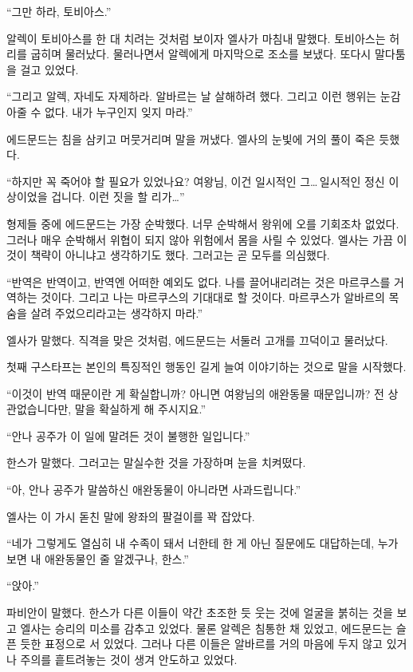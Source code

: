 ``그만 하라, 토비아스.''

알렉이 토비아스를 한 대 치려는 것처럼 보이자 엘사가 마침내 말했다. 토비아스는 허리를 굽히며 물러났다. 물러나면서 알렉에게 마지막으로 조소를 보냈다. 또다시 말다툼을 걸고 있었다.

``그리고 알렉, 자네도 자제하라. 알바르는 날 살해하려 했다. 그리고 이런 행위는 눈감아줄 수 없다. 내가 누구인지 잊지 마라.''

에드문드는 침을 삼키고 머뭇거리며 말을 꺼냈다. 엘사의 눈빛에 거의 풀이 죽은 듯했다.

``하지만 꼭 죽어야 할 필요가 있었나요? 여왕님, 이건 일시적인 그\ldots\,일시적인 정신 이상이었을 겁니다. 이런 짓을 할 리가\ldots''

형제들 중에 에드문드는 가장 순박했다. 너무 순박해서 왕위에 오를 기회조차 없었다. 그러나 매우 순박해서 위협이 되지 않아 위험에서 몸을 사릴 수 있었다. 엘사는 가끔 이것이 책략이 아니냐고 생각하기도 했다. 그러고는 곧 모두를 의심했다.

``반역은 반역이고, 반역엔 어떠한 예외도 없다. 나를 끌어내리려는 것은 마르쿠스를 거역하는 것이다. 그리고 나는 마르쿠스의 기대대로 할 것이다. 마르쿠스가 알바르의 목숨을 살려 주었으리라고는 생각하지 마라.''

엘사가 말했다. 직격을 맞은 것처럼, 에드문드는 서둘러 고개를 끄덕이고 물러났다.

첫째 구스타프는 본인의 특징적인 행동인 길게 늘여 이야기하는 것으로 말을 시작했다.

``이것이 반역 때문이란 게 확실합니까? 아니면 여왕님의 애완동물 때문입니까? 전 상관없습니다만, 말을 확실하게 해 주시지요.''

``안나 공주가 이 일에 말려든 것이 불행한 일입니다.''

한스가 말했다. 그러고는 말실수한 것을 가장하며 눈을 치켜떴다.

``아, 안나 공주가 말씀하신 애완동물이 아니라면 사과드립니다.''

엘사는 이 가시 돋친 말에 왕좌의 팔걸이를 꽉 잡았다.

``네가 그렇게도 열심히 내 수족이 돼서 너한테 한 게 아닌 질문에도 대답하는데, 누가 보면 내 애완동물인 줄 알겠구나, 한스.''

``앉아.''

파비안이 말했다. 한스가 다른 이들이 약간 초조한 듯 웃는 것에 얼굴을 붉히는 것을 보고 엘사는 승리의 미소를 감추고 있었다. 물론 알렉은 침통한 채 있었고, 에드문드는 슬픈 듯한 표정으로 서 있었다. 그러나 다른 이들은 알바르를 거의 마음에 두지 않고 있거나 주의를 흩트려놓는 것이 생겨 안도하고 있었다.

